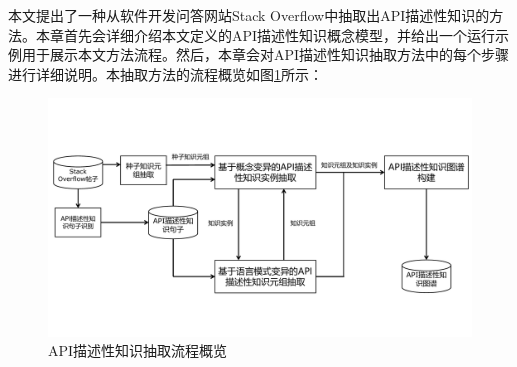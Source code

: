本文提出了一种从软件开发问答网站Stack Overflow中抽取出API描述性知识的方法。本章首先会详细介绍本文定义的API描述性知识概念模型，并给出一个运行示例用于展示本文方法流程。然后，本章会对API描述性知识抽取方法中的每个步骤进行详细说明。本抽取方法的流程概览如图\ref{图3-1}所示：

\begin{figure}[htb]
    \centering
    \includegraphics[width=\textwidth]{image/overview.pdf}
    \caption{API描述性知识抽取流程概览} 
    \label{图3-1} 
\end{figure}

